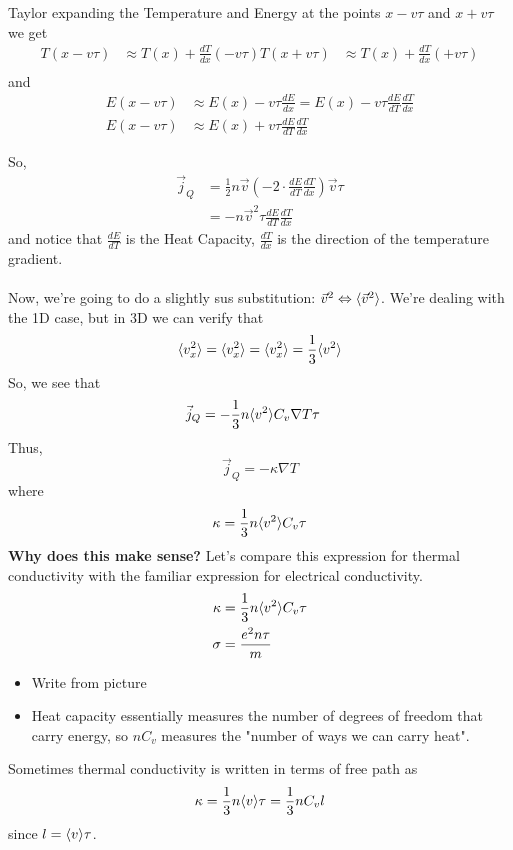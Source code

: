 \documentclass[11pt]{article}
\begin{document}
Taylor expanding the Temperature and Energy at the points $x - v\tau$ and $x + v\tau$ we get 
\begin{align*}
  T(x - v\tau) &\approx T(x) + \frac{dT}{dx}(-v\tau)
  T(x + v\tau) &\approx T(x) + \frac{dT}{dx}(+v\tau) \\
\end{align*}
and 
\begin{align*}
  E(x - v\tau) &\approx E(x) - v\tau \frac{dE}{dx} = E(x) - v\tau \frac{dE}{dT} \frac{dT}{dx} \\
  E(x - v\tau) &\approx E(x) + v\tau \frac{dE}{dT} \frac{dT}{dx}
\end{align*}

So, 
\begin{align*}
  \vec{j}_{Q} &= \frac{1}{2} n\vec{v} \left( - 2 \cdot \frac{dE}{dT} \frac{dT}{dx} \right) \vec{v}\tau \\
  &= -n\vec{v}^2 \tau \frac{dE}{dT} \frac{dT}{dx}
\end{align*}
and notice that $\frac{dE}{dT}$ is the Heat Capacity, $\frac{dT}{dx}$ is the direction of the temperature gradient.
\\
\\
Now, we're going to do a slightly sus substitution: $\vec{v}^2 \Leftrightarrow \langle \vec{v}^2 \rangle$. We're dealing with the 1D case, but in 3D we can verify that 
\[ \langle v_x^2 \rangle = \langle v_x^2 \rangle = \langle v_x^2 \rangle = \frac{1}{3}\langle v^2 \rangle \] So, we see that 
\begin{align*}
  \vec{j}_{Q} &= -\frac{1}{3} n\langle v^2 \rangle C_v \nabla T \tau 
\end{align*} Thus, 
\[ \vec{j}_{Q} = -\kappa \nabla T  \] where \[ \kappa = \frac{1}{3} n\langle v^2 \rangle C_v \tau \] \textbf{Why does this make sense?}
Let's compare this expression for thermal conductivity with the familiar expression for electrical conductivity.
\begin{align*}
  \kappa &= \frac{1}{3} n\langle v^2 \rangle C_v \tau  \\
  \sigma &= \frac{e^2 n \tau}{m}
\end{align*}
\begin{itemize}
  \item Write from picture
  \item Heat capacity essentially measures the number of degrees of freedom that carry energy, so $n C_v$ measures the "number of ways we can carry heat".
\end{itemize} Sometimes thermal conductivity is written in terms of free path as $$ \kappa = \frac{1}{3} n \langle v \rangle \tau = \frac{1}{3} nC_v l $$ since $l = \langle v \rangle \tau$.
\end{document}
